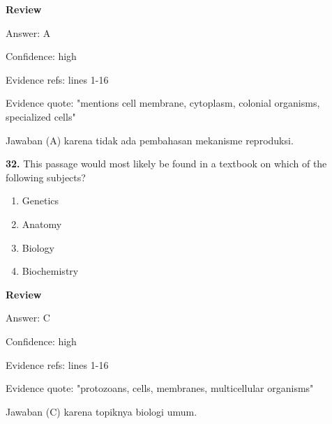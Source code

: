 \documentclass[12pt]{article}
\begin{document}
\par
\begingroup
\setlength{\parskip}{0pt}
\setlength{\parindent}{0pt}
\textbf{Review}\par
Answer: A\par
Confidence: high\par
Evidence refs: lines 1-16\par
Evidence quote: "mentions cell membrane, cytoplasm, colonial organisms, specialized cells"\par
Jawaban (A) karena tidak ada pembahasan mekanisme reproduksi.\par
\endgroup
\par
\vspace{0.25\baselineskip}
\noindent\textbf{32.} This passage would most likely be found in a textbook on which of the following subjects?
\begin{enumerate}[label=(\Alph*),leftmargin=*,itemsep=0.2em]
\item Genetics
\item Anatomy
\item Biology
\item Biochemistry
\end{enumerate}
\par
\begingroup
\setlength{\parskip}{0pt}
\setlength{\parindent}{0pt}
\textbf{Review}\par
Answer: C\par
Confidence: high\par
Evidence refs: lines 1-16\par
Evidence quote: "protozoans, cells, membranes, multicellular organisms"\par
Jawaban (C) karena topiknya biologi umum.\par
\endgroup
\par
\vspace{0.25\baselineskip}
\end{document}
